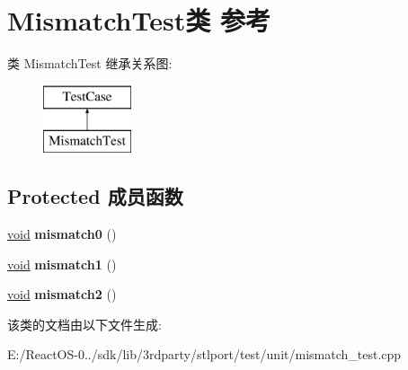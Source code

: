 \hypertarget{class_mismatch_test}{}\section{Mismatch\+Test类 参考}
\label{class_mismatch_test}
类 Mismatch\+Test 继承关系图\+:\begin{figure}[H]
\begin{center}
\leavevmode
\includegraphics[height=2.000000cm]{class_mismatch_test}
\end{center}
\end{figure}
\subsection*{Protected 成员函数}
\begin{DoxyCompactItemize}
\item 
\mbox{\label{class_mismatch_test_a3255416452842f2397bed03bc5e4d8af}} 
\hyperlink{interfacevoid}{void} {\bfseries mismatch0} ()
\item 
\mbox{\label{class_mismatch_test_a3d1fb253ed2a8f70da83886223961e1d}} 
\hyperlink{interfacevoid}{void} {\bfseries mismatch1} ()
\item 
\mbox{\label{class_mismatch_test_a3da55cbb16b9c4722e7c47f4f08af8a4}} 
\hyperlink{interfacevoid}{void} {\bfseries mismatch2} ()
\end{DoxyCompactItemize}


该类的文档由以下文件生成\+:\begin{DoxyCompactItemize}
\item 
E\+:/\+React\+O\+S-\/0../sdk/lib/3rdparty/stlport/test/unit/mismatch\+\_\+test.\+cpp\end{DoxyCompactItemize}
